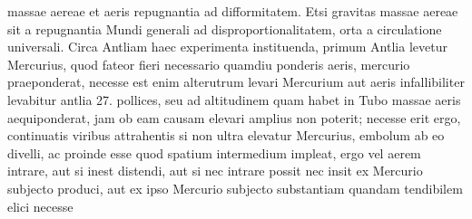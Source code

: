 massae\protect{} aereae  et aeris repugnantia ad difformitatem.  Etsi gravitas massae aereae\protect{} sit a repugnantia Mundi\protect{}  generali ad disproportionalitatem, orta a circulatione universali\protect{}. Circa Antliam\protect{} haec experimenta instituenda, primum Antlia\protect{}  levetur Mercurius\protect{}, quod fateor fieri necessario quamdiu ponderis aeris\protect{}, mercurio\protect{} praeponderat, necesse est enim alterutrum  levari Mercurium\protect{} aut aeris  infallibiliter levabitur antlia\protect{}  27. pollices, seu ad altitudinem quam habet  in Tubo  massae\protect{} aeris aequiponderat, jam  ob eam causam elevari amplius non poterit; necesse erit  ergo, continuatis viribus attrahentis si non ultra elevatur Mercurius\protect{}, embolum\protect{} ab eo divelli, ac proinde esse quod  spatium intermedium impleat, ergo vel aerem intrare, aut  si inest distendi, aut si nec intrare possit nec insit ex Mercurio\protect{} subjecto produci, aut ex ipso Mercurio\protect{}  subjecto substantiam quandam tendibilem elici necesse   
